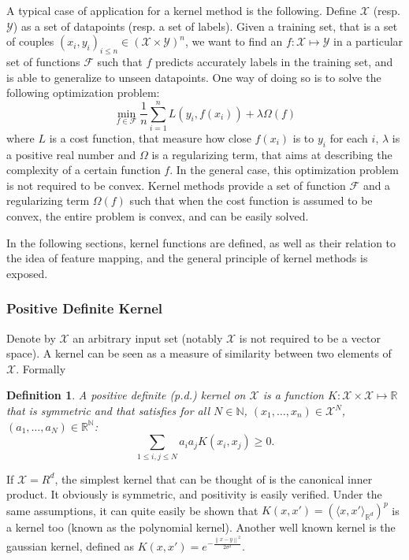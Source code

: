 \documentclass[a4paper, 11pt]{article}
\newtheorem{definition}{Definition}
\newcommand{\X}{\mathcal{X}}
\newcommand{\Y}{\mathcal{Y}}
\newcommand{\F}{\mathcal{F}}
\newcommand{\R}{\mathbb{R}}
\newcommand{\N}{\mathbb{N}}
\newcommand{\x}{x_i}
\newcommand{\y}{y_i}
\newcommand{\inner}[2]{\langle #1 , #2 \rangle_{\R^d}}
\newcommand{\norm}[1]{\left\| #1 \right\|}
\begin{document}
A typical case of application for a kernel method is the following. Define
$\X$ (resp. $\Y$) as a set of datapoints (resp. a set of labels). Given
a training set, that is a set of couples $(\x, \y)_{i\leq n} \in (\X \times \Y)^n$,
we want to find an $f : \X \mapsto \Y$ in a particular set of functions $\F$ such
that $f$ predicts accurately labels in the training set, and is able to generalize
to unseen datapoints. One way of doing so is to solve the following optimization
problem:
\begin{equation}
  \min\limits_{f\in\F} \frac{1}{n}\sum\limits_{i=1}^nL(\y,f(\x)) + \lambda\Omega(f)
  \label{eq:min}
\end{equation}
where $L$ is a cost function, that measure how close $f(\x)$ is to $\y$ for
each $i$, $\lambda$ is a positive real number and $\Omega$ is a regularizing
term, that aims at describing the complexity of a certain function $f$. In the
general case, this optimization problem is not required to be convex. Kernel
methods provide a set of function $\F$ and a regularizing term $\Omega(f)$ such
that when the cost function is assumed to be convex, the entire problem is
convex, and can be easily solved.

In the following sections, kernel functions are defined, as well as their
relation to the idea of feature mapping, and the general principle of kernel
methods is exposed.

\subsubsection{Positive Definite Kernel}
\label{subsub:psd}
Denote by $\X$ an arbitrary input set (notably $\X$ is not required to be a vector
space). A kernel can be seen as a measure of similarity between two elements of $\X$.
Formally
\begin{definition}
  A positive definite (p.d.) kernel on $\X$ is a function $K:\X\times\X \mapsto \R$ that
  is symmetric and that satisfies for all $N \in \N$, $(x_1, \dots, x_n) \in \X^N$,
  $(a_1, \dots, a_N) \in \R^\N$:
  \begin{equation}
    \sum\limits_{1 \leq i, j \leq N}a_ia_jK(x_i,x_j) \geq 0.
  \end{equation}
\end{definition}
If $\X = R^d$, the simplest kernel that can be thought of
is the canonical inner product. It obviously is symmetric, 
and positivity is easily verified. 
Under the same assumptions, it can quite easily be shown
that $K(x, x') = (\inner{x}{x'})^p$ is a kernel too (known
as the polynomial kernel). Another well known kernel is 
the gaussian kernel, defined as $K(x, x') = e^{- \frac{\norm{x-y}^2}{2\sigma^2}}$.
\end{document}
